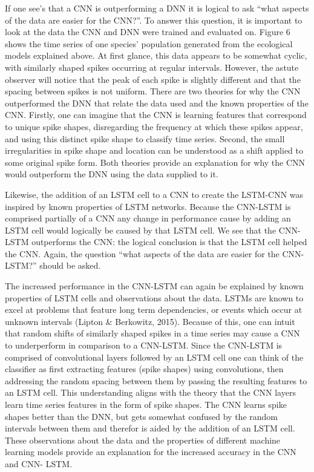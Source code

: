 \documentclass[letterpaper, 10 pt, conference]{ieeeconf}  %
\begin{document}
    If one see’s that a CNN is outperforming a DNN it is logical to ask “what aspects of the data are easier for the CNN?”. To answer this question, it is important to look at the data the CNN and DNN were trained and evaluated on.  Figure 6 shows the time series of one species’ population generated from the ecological models explained above. At first glance, this data appears to be somewhat cyclic, with similarly shaped spikes occurring at regular intervals. However, the astute observer will notice that the peak of each spike is slightly different and that the spacing between spikes is not uniform. There are two theories for why the CNN outperformed the DNN that relate the data used and the known properties of the CNN. Firstly, one can imagine that the CNN is learning features that correspond to unique spike shapes, disregarding the frequency at which these spikes appear, and using this distinct spike shape to classify time series. Second, the small irregularities in spike shape and location can be understood as a shift applied to some original spike form. Both theories provide an explanation for why the CNN would outperform the DNN using the data supplied to it. 

    Likewise, the addition of an LSTM cell to a CNN to create the LSTM-CNN was inspired by known properties of LSTM networks. Because the CNN-LSTM is comprised partially of a CNN any change in performance cause by adding an LSTM cell would logically be caused by that LSTM cell. We see that the CNN-LSTM outperforms the CNN: the logical conclusion is that the LSTM cell helped the CNN. Again, the question “what aspects of the data are easier for the CNN-LSTM?” should be asked. 
    
    The increased performance in the CNN-LSTM can again be explained by known properties of LSTM cells and observations about the data. LSTMs are known to excel at problems that feature long term dependencies, or events which occur at unknown intervals (Lipton & Berkowitz, 2015). Because of this, one can intuit that random shifts of similarly shaped spikes in a time series may cause a CNN to underperform in comparison to a CNN-LSTM. Since the CNN-LSTM is comprised of convolutional layers followed by an LSTM cell one can think of the classifier as first extracting features (spike shapes) using convolutions, then addressing the random spacing between them by passing the resulting features to an LSTM cell. This understanding aligns with the theory that the CNN layers learn time series features in the form of spike shapes. The CNN learns spike shapes better than the DNN, but gets somewhat confused by the random intervals between them and therefor is aided by the addition of an LSTM cell. These observations about the data and the properties of different machine learning models provide an explanation for the increased accuracy in the CNN and CNN- LSTM. 
\end{document}
